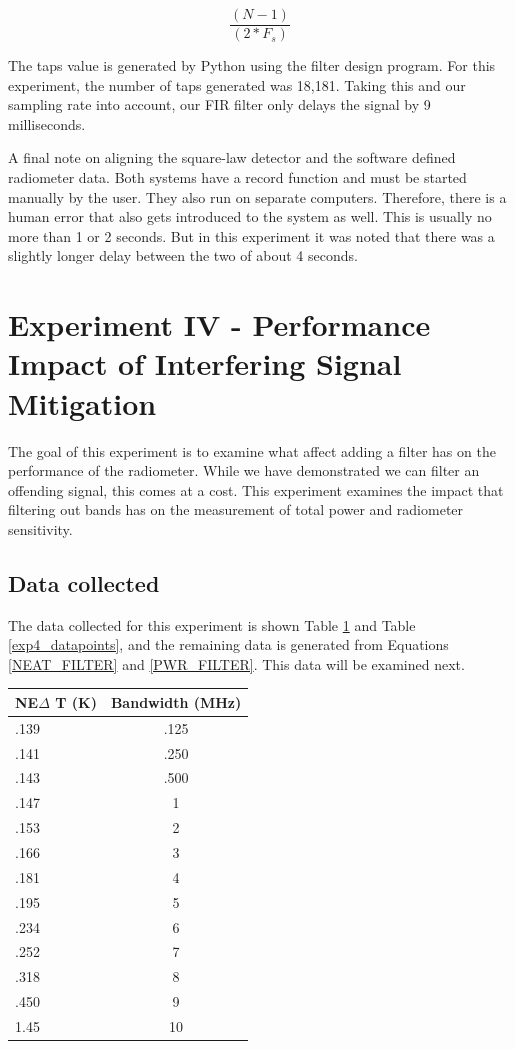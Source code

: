 \begin{equation}\label{FIR_delay}
\frac{(N - 1)}{(2*F_{s})}
\end{equation}

The taps value is generated by Python using the filter design program.  For this experiment, the number of taps generated was 18,181.  Taking this and our sampling rate into account, our FIR filter only delays the signal by 9 milliseconds.  

A final note on aligning the square-law detector and the software defined radiometer data.  Both systems have a record function and must be started manually by the user.  They also run on separate computers.  Therefore, there is a human error that also gets introduced to the system as well.  This is usually no more than 1 or 2 seconds.  But in this experiment it was noted that there was a slightly longer delay between the two of about 4 seconds.  

\section{Experiment IV - Performance Impact of Interfering Signal Mitigation} \label{Exp4_results}
The goal of this experiment is to examine what affect adding a filter has on the performance of the radiometer.  While we have demonstrated we can filter an offending signal, this comes at a cost.  This experiment examines the impact that filtering out bands has on the measurement of total power and radiometer sensitivity.

\subsection{Data collected}
The data collected for this experiment is shown Table \ref{exp4_data_power} and Table \ref{exp4_datapoints}, and the remaining data is generated from Equations \ref{NEAT_FILTER} and \ref{PWR_FILTER}.  This data will be examined next.

\begin{table}[h!tb] \centering
{}
\label{exp4_data_power}
\begin{tabular}{lc} \hline
\textbf{NE$\Delta$ T (K)} & \textbf{Bandwidth (MHz) } \\ \hline
.139 & .125 \\
.141 & .250 \\
.143 & .500 \\
.147 & 1 \\
.153 & 2 \\
.166 & 3 \\
.181 & 4 \\
.195 & 5 \\
.234 & 6 \\
.252 & 7 \\
.318 & 8 \\
.450 & 9 \\
1.45 & 10 \\ \hline
\end{tabular}
\end{table}

